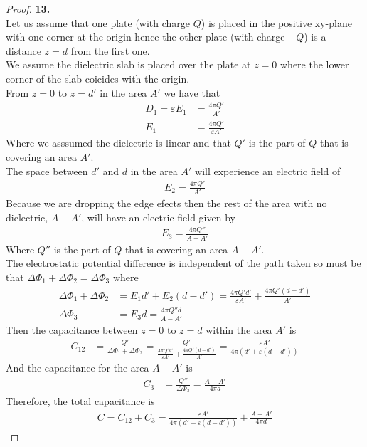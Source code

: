 \documentclass[11pt]{article}
\theoremstyle{definition}
\begin{document}
\cleardoublepage
\begin{proof}{\textbf{13.}}\\
Let us assume that one plate (with charge $Q$) is placed in the positive
xy-plane with one corner at the origin hence the other plate (with charge $-Q$)
is a distance $z = d$ from the first one.
\\
We assume the dielectric slab is placed over the plate at $z=0$ where the
lower corner of the slab coicides with the origin.
\\
From $z = 0$ to $z = d'$ in the area $A'$ we have that
\begin{align*}
    D_{1} = \varepsilon E_{1} &= \frac{4\pi Q'}{A'}\\
    E_{1} &= \frac{4\pi Q'}{\varepsilon A'}
\end{align*}
Where we asssumed the dielectric is linear and that $Q'$ is the part of $Q$
that is covering an area $A'$.
\\
The space between $d'$ and $d$ in the area $A'$ will experience an electric
field of 
\begin{align*}
    E_{2} = \frac{4\pi Q'}{A'}
\end{align*}
Because we are dropping the edge efects then the rest of the area with no
dielectric, $A - A'$, will have an electric field given by
\begin{align*}
    E_{3} = \frac{4\pi Q''}{A - A'}
\end{align*}
Where $Q''$ is the part of $Q$ that is covering an area $A - A'$.
\\
The electrostatic potential difference is independent of the path taken so
must be that $\Delta\Phi_1 + \Delta\Phi_2 = \Delta\Phi_3$ where 
\begin{align*}
    \Delta\Phi_1 + \Delta\Phi_2
    &= E_1d' + E_2(d -d')
    = \frac{4\pi Q' d'}{\varepsilon A'}
    + \frac{4\pi Q'(d - d')}{ A'} \\
    \Delta\Phi_3 &= E_3 d
    = \frac{4\pi Q'' d}{ A - A'}
\end{align*}
Then the capacitance between $z = 0$ to $z = d$ within the area $A'$ is
\begin{align*}
    C_{12} &= \frac{Q'}{\Delta\Phi_1 + \Delta\Phi_2}
    = \frac{Q'}{\frac{4\pi Q' d'}{\varepsilon A'}
    + \frac{4\pi Q'(d - d')}{ A'}}
    = \frac{\varepsilon A'}{4\pi(d' + \varepsilon(d - d'))}
\end{align*}
And the capacitance for the area $A - A'$ is
\begin{align*}
    C_3 &= \frac{Q''}{\Delta\Phi_3}
    = \frac{A - A'}{4\pi d}
\end{align*}
Therefore, the total capacitance is
\begin{align*}
    C = C_{12} + C_3
    = \frac{\varepsilon A'}{4\pi(d' + \varepsilon(d - d'))}
    + \frac{A - A'}{4\pi d}
\end{align*}
\end{proof}
\end{document}
